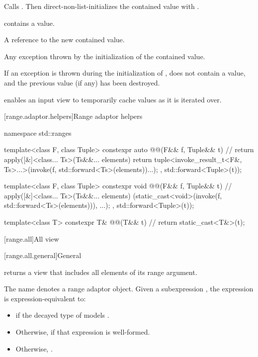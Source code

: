\begin{itemize}
\begin{itemdescr}
 \effects
Calls .
Then direct-non-list-initializes the contained value with .

 \ensures
{} contains a value.

 \returns
A reference to the new contained value.

 \throws
Any exception thrown by the initialization of the contained value.

 \remarks
If an exception is thrown during the initialization of ,
 does not contain a value, and
the previous value (if any) has been destroyed.
\end{itemdescr}
\end{itemize}

\pnum
\begin{note}
 enables an input view
to temporarily cache values as it is iterated over.
\end{note}

[range.adaptor.helpers]{Range adaptor helpers}

\begin{codeblock}
namespace std::ranges {
  template<class F, class Tuple>
  constexpr auto @@(F&& f, Tuple&& t) { // \expos
    return apply([&]<class... Ts>(Ts&&... elements) {
      return tuple<invoke_result_t<F&, Ts>...>(invoke(f, std::forward<Ts>(elements))...);
    }, std::forward<Tuple>(t));
  }

  template<class F, class Tuple>
  constexpr void @@(F&& f, Tuple&& t) { // \expos
    apply([&]<class... Ts>(Ts&&... elements) {
      (static_cast<void>(invoke(f, std::forward<Ts>(elements))), ...);
    }, std::forward<Tuple>(t));
  }

  template<class T>
  constexpr T& @@(T&& t) {                   // \expos
    return static_cast<T&>(t);
  }
}
\end{codeblock}

[range.all]{All view}

[range.all.general]{General}

\pnum
{}%
 returns a view that includes all elements of
its range argument.

\pnum
The name  denotes a
range adaptor object.
Given a subexpression , the expression
 is expression-equivalent to:
\begin{itemize}
\item {} if the decayed type of 
models .

\item Otherwise,  if that expression is well-formed.

\item Otherwise, .
\end{itemize}

